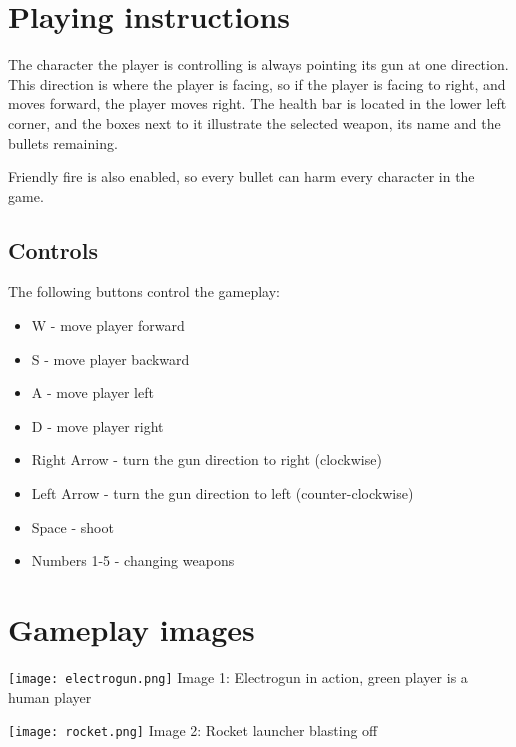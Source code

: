 \documentclass[a4paper,11pt]{article}
\begin{document}
\section*{Playing instructions}
The character the player is controlling is always pointing its gun at one direction. This direction is where the player is facing, so if the player is facing to right, and moves forward, the player moves right. The health bar is located in the lower left corner, and the boxes next to it illustrate the selected weapon, its name and the bullets remaining.

Friendly fire is also enabled, so every bullet can harm every character in the game.
\subsection*{Controls}
The following buttons control the gameplay:
\begin{itemize}
\item W - move player forward
\item S - move player backward
\item A - move player left
\item D - move player right
\item Right Arrow - turn the gun direction to right (clockwise)
\item Left Arrow - turn the gun direction to left (counter-clockwise)
\item Space - shoot
\item Numbers 1-5 - changing weapons
\end{itemize}

\appendix
\section*{Gameplay images}
\begin{center}
\texttt{[image: electrogun.png]}
Image 1: Electrogun in action, green player is a human player
\end{center}
\begin{center}
\texttt{[image: rocket.png]}
Image 2: Rocket launcher blasting off
\end{center}
\end{document}

